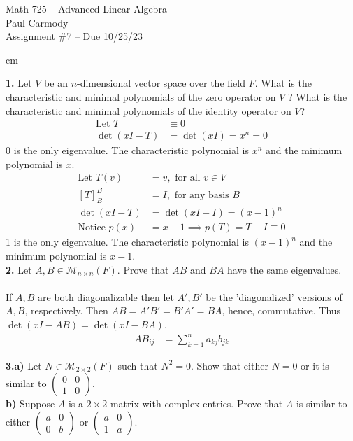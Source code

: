 \documentclass[11pt]{amsart}
\theoremstyle{definition}  %
\begin{document}
\begin{center}
\Large{Math 725 -- Advanced Linear Algebra}\\
\large{Paul Carmody}\\
Assignment \#7 -- Due 10/25/23
\end{center}

 cm

\noindent
{\bf 1.} Let $V$ be an $n$-dimensional vector space over the field $F$. What is the characteristic and minimal polynomials of the zero operator on $V$ ?
What is the characteristic and minimal polynomials of the identity operator on $V$? \\
\begin{align*}
	\text{Let } T &\equiv 0  \\
	\det(xI-T) &= \det(xI) = x^n = 0
\end{align*}0 is the only eigenvalue.  The characteristic polynomial is $x^n$ and the minimum polynomial is $x$.
\begin{align*}
	\text{Let } T(v) &= v, \text{ for all } v \in V \\
	[T]_B^B &= I, \text{ for any basis }B\\
	\det(xI-T) &= \det(xI-I) = (x-1)^n \\
	\text{Notice } p(x) &= x-1 \implies p(T) = T-I \equiv 0
\end{align*}1 is the only eigenvalue.  The characteristic polynomial is $(x-1)^n$ and the minimum polynomial is $x-1$.\\

\vskip 0.1cm
\noindent
{\bf 2.}  Let $A, B \in \mathcal{M}_{n \times n}(F)$.  Prove that $AB$ and $BA$ have the same eigenvalues.\\
\\
If $A,B$ are both diagonalizable then let $A', B'$ be the 'diagonalized' versions of $A,B$, respectively.  Then $AB = A'B' = B'A' = BA$, hence, commutative.  Thus $\det(xI-AB) = \det(xI-BA)$.
\begin{align*}
	AB_{ij} &= \sum_{k=1}^n a_{kj}b_{jk}
\end{align*}

\vskip 0.1cm
\noindent
{\bf 3.a)}  Let $N \in \mathcal{M}_{2 \times 2}(F)$ such that $N^2 = 0$. Show that either $N = 0$ or it is similar to $\left( \begin{array}{cc} 0 & 0 \\ 1 & 0 \end{array} \right)$.\\
{\bf b)}  Suppose $A$ is a $ 2 \times 2$ matrix with complex entries. Prove that $A$ is similar to either $\left( \begin{array}{cc} a & 0 \\ 0  & b \end{array} \right)$ or
$\left( \begin{array}{cc} a & 0 \\ 1 & a \end{array} \right)$.\\
\end{document}
